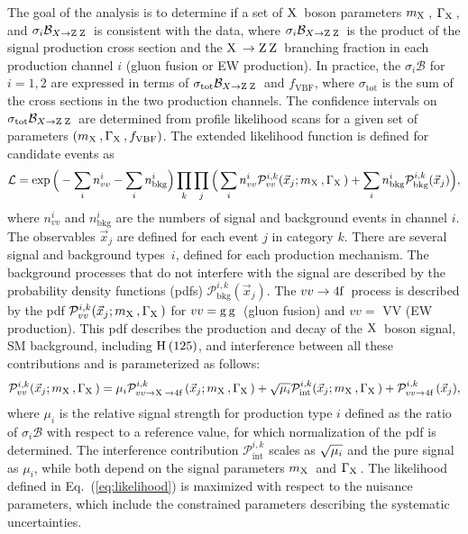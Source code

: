  The goal of the analysis is to determine if a set of $\mathrm{X}\hspace{0.2em}$ boson parameters
 $m_{\mathrm{X}\hspace{0.2em}}$, $\Gamma_{\mathrm{X}\hspace{0.2em}}$, and $\sigma_i\mathcal{B}_{X\to\mathrm{Z}\hspace{0.2em}\mathrm{Z}\hspace{0.2em}}$ is consistent with the data, where $\sigma_i\mathcal{B}_{X\to\mathrm{Z}\hspace{0.2em}\mathrm{Z}\hspace{0.2em}}$ is the product of the signal production cross section and
 the $\mathrm{X}\hspace{0.2em}\to\mathrm{Z}\hspace{0.2em}\mathrm{Z}\hspace{0.2em}$ branching fraction in each production channel $i$ (gluon fusion or EW production). In practice, the $\sigma_i\mathcal{B}$ for $i=1,2$ are expressed in terms of
 $\sigma_{\mathrm{tot}}\mathcal{B}_{X\to\mathrm{Z}\hspace{0.2em}\mathrm{Z}\hspace{0.2em}}$ and $f_{\mathrm{VBF}}$, where $\sigma_{\mathrm{tot}}$ is the sum of the cross sections in the two production channels. The confidence intervals on $\sigma_{\mathrm{tot}}\mathcal{B}_{X\to\mathrm{Z}\hspace{0.2em}\mathrm{Z}\hspace{0.2em}}$
 are determined from profile likelihood scans for a given set of parameters $(m_{\mathrm{X}\hspace{0.2em}}, \Gamma_{\mathrm{X}\hspace{0.2em}}, f_{\mathrm{VBF}})$.
 The extended likelihood function is defined for candidate events as
 \begin{eqnarray}
 \mathcal{L} =  \exp\Big( - \sum_{i} n_{vv}^i -\sum_i n_\text{bkg}^i  \Big)
 \prod_k \prod_j
 \Big(
   \sum_i n_{vv}^{i} \mathcal{P}^{i,k}_{vv}(\vec{x}_{j}; m_{\mathrm{X}\hspace{0.2em}}, \Gamma_{\mathrm{X}\hspace{0.2em}})
 +\sum_i n_\text{bkg}^{i} \mathcal{P}^{i,k}_\text{bkg}(\vec{x}_{j})
 \Big),
 \label{eq:likelihood}
 \end{eqnarray}
 where $n_{vv}^i$ and $n_\text{bkg}^i$ are the numbers of signal and background events in channel $i$. The observables $\vec{x}_j$ are defined for each event $j$ in category $k$.
 There are several signal and background types~$i$, defined for each production mechanism.
 The background processes that do not interfere with the signal are described by the probability density functions (pdfs)
  $\mathcal{P}^{i,k}_\text{bkg}(\vec{x}_{j})$. The $vv\to 4 \textrm{f}\hspace{0.2em}$ process is described by the pdf
 $\mathcal{P}^{i,k}_{vv}(\vec{x}_{j}; m_{\mathrm{X}\hspace{0.2em}}, \Gamma_{\mathrm{X}\hspace{0.2em}})$ for $vv=\mathrm{g}\hspace{0.2em}\mathrm{g}\hspace{0.2em}$ (gluon fusion) and $vv= $ VV (EW production).
 This pdf describes the production and decay of the $\mathrm{X}\hspace{0.2em}$ boson signal, SM background, including $\mathrm{H}\hspace{0.2em}(125)$, and interference between all these contributions
 and is parameterized as follows:
 \begin{eqnarray}
 \mathcal{P}^{i,k}_{vv} (\vec{x}_{j}; m_{\mathrm{X}\hspace{0.2em}}, \Gamma_{\mathrm{X}\hspace{0.2em}}) =
 \mu_i  \mathcal{P}^{i,k}_{vv\to \mathrm{X}\hspace{0.2em}\to 4 \textrm{f}\hspace{0.2em}} (\vec{x}_{j}; m_{\mathrm{X}\hspace{0.2em}}, \Gamma_{\mathrm{X}\hspace{0.2em}})
 + \sqrt{\mu_i}  \mathcal{P}^{i,k}_{\mathrm{int}} (\vec{x}_{j}; m_{\mathrm{X}\hspace{0.2em}}, \Gamma_{\mathrm{X}\hspace{0.2em}})
 + \mathcal{P}^{i,k}_{vv\to4 \textrm{f}\hspace{0.2em}} (\vec{x}_{j})
 ,
 \label{eq:psig}
 \end{eqnarray}
 where $\mu_i$ is the relative signal strength for production type $i$ defined as the ratio of
 $\sigma_i\mathcal{B}$ with respect to a reference value, for which normalization of the pdf is determined.
 The interference contribution $\mathcal{P}^{i,k}_{\mathrm{int}}$ scales as $\sqrt{\smash[b]{\mu_i}}$ and the pure signal as ${\mu_i}$,
 while both depend on the signal parameters $m_{\mathrm{X}\hspace{0.2em}}$ and $\Gamma_{\mathrm{X}\hspace{0.2em}}$.
 The likelihood defined in Eq.~(\ref{eq:likelihood}) is maximized with respect to the nuisance parameters,
 which include the constrained parameters describing the systematic uncertainties.

